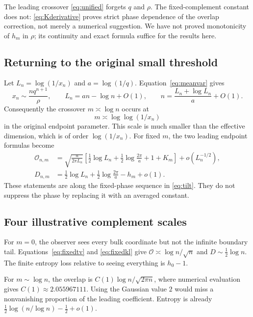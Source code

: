 \documentclass[11pt,a4paper]{article}
\numberwithin{equation}{section}
\theoremstyle{definition}
\theoremstyle{remark}
\newcommand{\ov}{\mathcal O}
\begin{document}
The leading crossover \eqref{eq:unified} forgets $q$ and $\rho$.
The fixed-complement constant does not: \eqref{eq:Kderivative} proves
strict phase dependence of the overlap correction, not merely a numerical
suggestion. We have not proved monotonicity of $h_m$ in $\rho$; its
continuity and exact formula suffice for the results here.

\subsection{Returning to the original small threshold}
Let $L_n=\log(1/x_n)$ and $a=\log(1/q)$. Equation~\eqref{eq:meanvar}
gives
\begin{equation}\label{eq:endpointscale}
x_n\sim\frac{nq^{n+1}}\rho,\qquad
L_n=an-\log n+O(1),\qquad
n=\frac{L_n+\log L_n}{a}+O(1).
\end{equation}
Consequently the crossover $m\asymp\log n$ occurs at
\begin{equation}\label{eq:doublylog}
m\asymp\log\log(1/x_n)
\end{equation}
in the original endpoint parameter. This scale is much smaller than
the effective dimension, which is of order $\log(1/x_n)$.
For fixed $m$, the two leading endpoint formulas become
\begin{align}
\ov_{n,m}
 &=\sqrt{\frac{a}{2\pi L_n}}
   \left[\frac12\log L_n+\frac12\log\frac{2\pi}{a}+1+K_m\right]
     +o(L_n^{-1/2}),\label{eq:endpointtv}\\
D_{n,m}&=\frac12\log L_n+\frac12\log\frac{2\pi}{a}-h_m+o(1).
\label{eq:endpointkl}
\end{align}
These statements are along the fixed-phase sequence in
\eqref{eq:tilt}. They do not suppress the phase by replacing it with
an averaged constant.

\subsection{Four illustrative complement scales}
For $m=0$, the observer sees every bulk coordinate but not the infinite
boundary tail. Equations~\eqref{eq:fixedtv} and \eqref{eq:fixedkl} give
$\ov\asymp\log n/\sqrt n$ and $D\sim\tfrac12\log n$. The finite entropy
loss relative to seeing everything is $h_0-1$.

For $m\sim\log n$, the overlap is
$C(1)\log n/\sqrt{2\pi n}$, where numerical evaluation gives
$C(1)\approx2.055967111$. Using the Gaussian value $2$ would miss a
nonvanishing proportion of the leading coefficient. Entropy is already
$\tfrac12\log(n/\log n)-\tfrac12+o(1)$.
\end{document}
